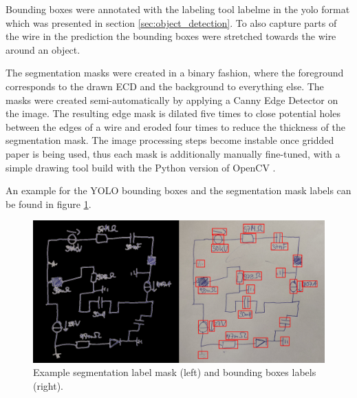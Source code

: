 Bounding boxes were annotated with the labeling tool labelme \cite{labelme} in the yolo format which was presented in section \ref{sec:object_detection}.
To also capture parts of the wire in the prediction the bounding boxes were stretched towards the wire around an object.

The segmentation masks were created in a binary fashion, where the foreground corresponds to the drawn \ac{ECD} and the background to everything else.
The masks were created semi-automatically by applying a Canny Edge Detector \cite{canny_edge} on the image.
The resulting edge mask is dilated five times to close potential holes between the edges of a wire and eroded four times to reduce the thickness of the segmentation mask.
The image processing steps become instable once gridded paper is being used, thus each mask is additionally manually fine-tuned, with a simple drawing tool build with the Python version of OpenCV \cite{opencv}.

An example for the \ac{YOLO} bounding boxes and the segmentation mask labels can be found in figure \ref{fig:example_labels}.

\begin{figure}
\begin{center}

    \includegraphics[width=\columnwidth]{imgs/labels/both_example.png}
    \caption{Example segmentation label mask (left) and bounding boxes labels (right).}
    \label{fig:example_labels}

\end{center}
\end{figure}


